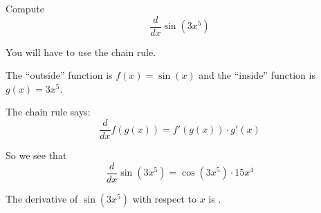 \begin{question}
  Compute
  \[
  \frac{d}{dx} \sin(3x^5)
  \]
  \begin{solution}
    \begin{hint}
      You will have to use the chain rule.
    \end{hint}
    \begin{hint}
      The ``outside'' function is $f(x) = \sin(x)$ and the ``inside''
      function is $g(x) = 3x^5$.
    \end{hint}
    \begin{hint}
      The chain rule says:
      \[
      \frac{d}{dx} f(g(x)) = f'(g(x))\cdot g'(x)
      \]
    \end{hint}
    \begin{hint}
      So we see that
      \[
      \frac{d}{dx} \sin(3x^5) = \cos(3x^5) \cdot 15 x^4
      \]
    \end{hint}
    The derivative of $\sin(3x^5)$ with respect to $x$ is
    .
  \end{solution}
\end{question}
